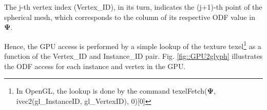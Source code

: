 \documentclass[twoside,twocolumn,10pt]{article}
\begin{document}
The j-th vertex index (Vertex\_ID), in its turn, indicates the (j+1)-th point of the spherical mesh, which corresponds to the column of its respective ODF value in $\bm{\Psi}$.

Hence, the GPU access is performed by a simple lookup of the texture texel\footnote{In OpenGL, the lookup is done by the command texelFetch($\bm{\Psi}$, ivec2(gl\_InstanceID, gl\_VertexID), 0)[0]} as a function of the Vertex\_ID and Instance\_ID pair. Fig. \ref{fig::GPU2glyph} illustrates the ODF access for each instance and vertex in the GPU.


\end{document}
